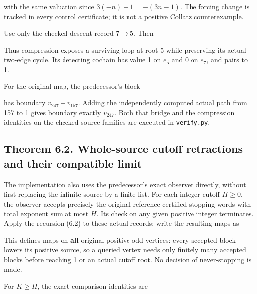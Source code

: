 
with the same valuation since \(3(-n)+1=-(3n-1)\). The forcing change is
tracked in every control certificate; it is not a positive Collatz
counterexample.

Use only the checked descent record \(7\to5\). Then


Thus compression exposes a surviving loop at root 5 while preserving its
actual two-edge cycle. Its detecting cochain has value 1 on \(e_5\) and
0 on \(e_7\), and pairs to 1.

For the original map, the predecessor's block


has boundary \(v_{247}-v_{157}\). Adding the independently computed
actual path from 157 to 1 gives boundary exactly \(v_{247}\). Both that
bridge and the compression identities on the checked source families are
executed in \nolinkurl{verify.py}.

\subsection{Theorem 6.2. Whole-source cutoff retractions and their
compatible limit}

The implementation also uses the predecessor's exact observer directly,
without first replacing the infinite source by a finite list. For each
integer cutoff \(H\ge0\), the observer accepts precisely the original
reference-certified stopping words with total exponent sum at most
\(H\). Its check on any given positive integer terminates. Apply the
recursion (6.2) to these actual records; write the resulting maps as


This defines maps on \textbf{all} original positive odd vertices: every
accepted block lowers its positive source, so a queried vertex needs
only finitely many accepted blocks before reaching 1 or an actual cutoff
root. No decision of never-stopping is made.

For \(K\ge H\), the exact comparison identities are


